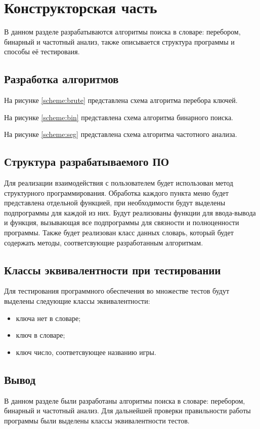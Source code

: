 \chapter{Конструкторская часть}

В данном разделе разрабатываются алгоритмы поиска в словаре: перебором,
бинарный и частотный анализ, также описывается структура программы и способы её
тестироваия.

\section{Разработка алгоритмов}

На рисунке \ref{scheme:brute} представлена схема алгоритма перебора ключей.

На рисунке \ref{scheme:bin} представлена схема алгоритма бинарного поиска.

На рисунке \ref{scheme:seg} представлена схема алгоритма частотного анализа.

\noindent
{}
\noindent
{}
\noindent
{}

\clearpage
\section{Структура разрабатываемого ПО}

Для реализации взаимодействия с пользователем будет использован метод
структурного программирования. Обработка каждого пункта меню будет представлена
отдельной функцией, при необходимости будут выделены подпрограммы для каждой из
них. Будут реализованы функции для ввода-вывода и функция, вызывающая все
подпрограммы для связности и полноценности программы. Также будет реализован
класс данных словарь, который будет содержать методы, соответсвующие
разработанным алгоритмам.

\section{Классы эквивалентности при тестировании}

Для тестирования программного обеспечения во множестве тестов будут выделены
следующие классы эквивалентности:
\begin{itemize}[left=\parindent]
    \item ключа нет в словаре;
    \item ключ в словаре;
    \item ключ число, соответсвующее названию игры.
\end{itemize}

\section{Вывод}

В данном разделе были разработаны алгоритмы поиска в словаре: перебором,
бинарный и частотный анализ. Для дальнейшей проверки правильности работы
программы были выделены классы эквивалентности тестов.
